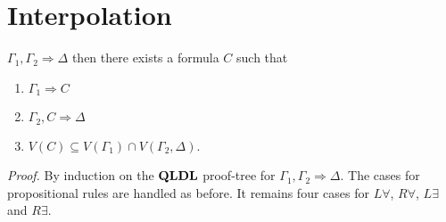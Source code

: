 \documentclass[a4paper, 12pt]{paper}
\begin{document}
\section{Interpolation} $\Gamma_1, \Gamma_2 \Rightarrow \Delta$ then there exists a formula $C$ such that
\begin{enumerate}
  \item $\Gamma_1 \Rightarrow C$
  \item $\Gamma_2, C \Rightarrow \Delta$
  \item $V(C) \subseteq V(\Gamma_1) \cap V(\Gamma_2, \Delta)$.
\end{enumerate}
\emph{Proof.} By induction on the $\mathbf{QLDL}$ proof-tree for $\Gamma_1, \Gamma_2 \Rightarrow \Delta$. The cases for propositional rules are handled as before. It remains four cases for $L \forall$, $R \forall$, $L \exists$ and $R \exists$.
\end{document}
